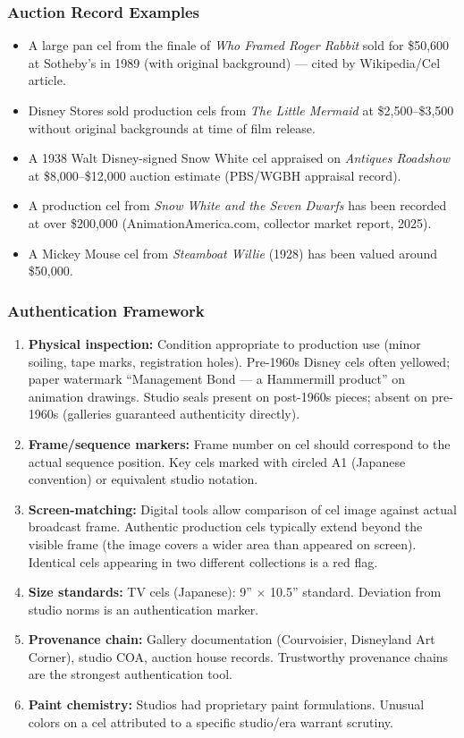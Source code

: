 \documentclass[11pt,letterpaper]{article}
\begin{document}
\subsubsection{Auction Record Examples}

\begin{itemize}
  \item A large pan cel from the finale of \textit{Who Framed Roger Rabbit} sold for \$50,600 at Sotheby's in 1989 (with original background) --- cited by Wikipedia/Cel article.
  \item Disney Stores sold production cels from \textit{The Little Mermaid} at \$2,500--\$3,500 without original backgrounds at time of film release.
  \item A 1938 Walt Disney-signed Snow White cel appraised on \textit{Antiques Roadshow} at \$8,000--\$12,000 auction estimate (PBS/WGBH appraisal record).
  \item A production cel from \textit{Snow White and the Seven Dwarfs} has been recorded at over \$200,000 (AnimationAmerica.com, collector market report, 2025).
  \item A Mickey Mouse cel from \textit{Steamboat Willie} (1928) has been valued around \$50,000.
\end{itemize}

\subsubsection{Authentication Framework}

\begin{enumerate}
  \item \textbf{Physical inspection:} Condition appropriate to production use (minor soiling, tape marks, registration holes). Pre-1960s Disney cels often yellowed; paper watermark ``Management Bond --- a Hammermill product'' on animation drawings. Studio seals present on post-1960s pieces; absent on pre-1960s (galleries guaranteed authenticity directly).
  \item \textbf{Frame/sequence markers:} Frame number on cel should correspond to the actual sequence position. Key cels marked with circled A1 (Japanese convention) or equivalent studio notation.
  \item \textbf{Screen-matching:} Digital tools allow comparison of cel image against actual broadcast frame. Authentic production cels typically extend beyond the visible frame (the image covers a wider area than appeared on screen). Identical cels appearing in two different collections is a red flag.
  \item \textbf{Size standards:} TV cels (Japanese): 9'' $\times$ 10.5'' standard. Deviation from studio norms is an authentication marker.
  \item \textbf{Provenance chain:} Gallery documentation (Courvoisier, Disneyland Art Corner), studio COA, auction house records. Trustworthy provenance chains are the strongest authentication tool.
  \item \textbf{Paint chemistry:} Studios had proprietary paint formulations. Unusual colors on a cel attributed to a specific studio/era warrant scrutiny.
\end{enumerate}
\end{document}
